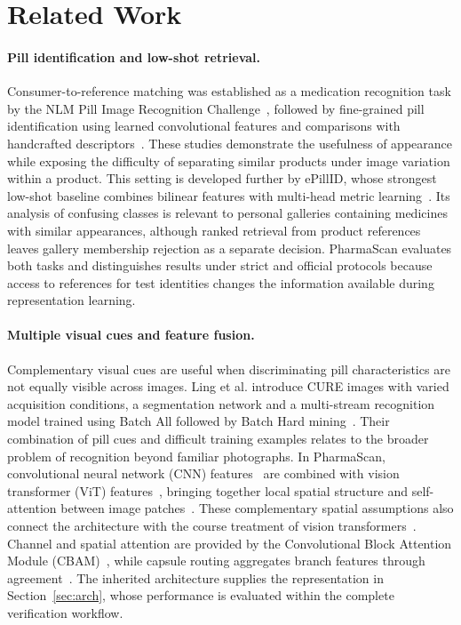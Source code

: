 \section{Related Work}
\label{sec:related}
\paragraph{Pill identification and low-shot retrieval.}
Consumer-to-reference matching was established as a medication recognition task by the NLM Pill Image Recognition Challenge~\citep{yaniv2016nlm}, followed by fine-grained pill identification using learned convolutional features and comparisons with handcrafted descriptors~\citep{wong2017pill}. These studies demonstrate the usefulness of appearance while exposing the difficulty of separating similar products under image variation within a product. This setting is developed further by ePillID, whose strongest low-shot baseline combines bilinear features with multi-head metric learning~\citep{usuyama2020epillid}. Its analysis of confusing classes is relevant to personal galleries containing medicines with similar appearances, although ranked retrieval from product references leaves gallery membership rejection as a separate decision. PharmaScan evaluates both tasks and distinguishes results under strict and official protocols because access to references for test identities changes the information available during representation learning.

\paragraph{Multiple visual cues and feature fusion.}
Complementary visual cues are useful when discriminating pill characteristics are not equally visible across images. Ling et al. introduce CURE images with varied acquisition conditions, a segmentation network and a multi-stream recognition model trained using Batch All followed by Batch Hard mining~\citep{ling2020fewshot}. Their combination of pill cues and difficult training examples relates to the broader problem of recognition beyond familiar photographs. In PharmaScan, convolutional neural network (CNN) features~\citep{simonyan2015vgg} are combined with vision transformer (ViT) features~\citep{dosovitskiy2021vit}, bringing together local spatial structure and self-attention between image patches~\citep{vaswani2017attention}. These complementary spatial assumptions also connect the architecture with the course treatment of vision transformers~\citep[p.~36]{md6329lecture09}. Channel and spatial attention are provided by the Convolutional Block Attention Module (CBAM)~\citep{woo2018cbam}, while capsule routing aggregates branch features through agreement~\citep{sabour2017capsules}. The inherited architecture supplies the representation in Section~\ref{sec:arch}, whose performance is evaluated within the complete verification workflow.

